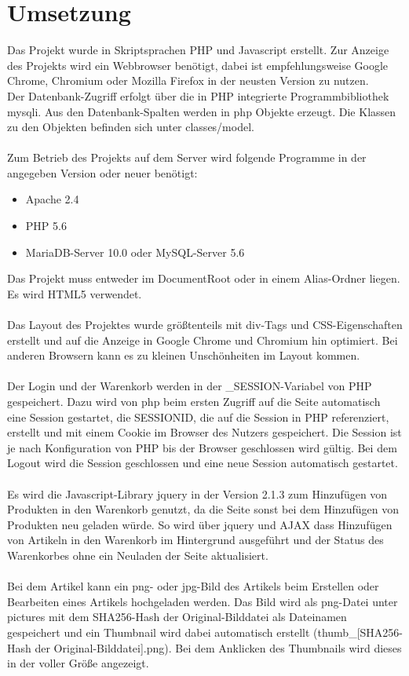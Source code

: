 \documentclass[a4paper,oneside,12pt]{scrartcl}
\begin{document}
\section{Umsetzung}
Das Projekt wurde in Skriptsprachen PHP und Javascript erstellt.
Zur Anzeige des Projekts wird ein Webbrowser benötigt, dabei ist empfehlungsweise
Google Chrome, Chromium oder Mozilla Firefox in der neusten Version zu nutzen.\\
Der Datenbank-Zugriff erfolgt über die in PHP integrierte Programmbibliothek mysqli.
Aus den Datenbank-Spalten werden in php Objekte erzeugt. Die Klassen zu den Objekten befinden sich unter classes/model.\\
\\
Zum Betrieb des Projekts auf dem Server wird folgende Programme in der angegeben Version oder neuer benötigt:
\begin{itemize}
 \item Apache 2.4
 \item PHP 5.6
 \item MariaDB-Server 10.0 oder MySQL-Server 5.6
\end{itemize}
Das Projekt muss entweder im DocumentRoot oder in einem Alias-Ordner liegen. Es wird HTML5 verwendet.\\
\\
Das Layout des Projektes wurde größtenteils mit div-Tags und CSS-Eigenschaften erstellt und auf die Anzeige
in Google Chrome und Chromium hin optimiert. Bei anderen Browsern kann es zu kleinen Unschönheiten im Layout kommen.\\
\\
Der Login und der Warenkorb werden in der \_SESSION-Variabel von PHP gespeichert. Dazu wird von php beim ersten Zugriff auf die Seite automatisch eine
Session gestartet, die SESSIONID, die auf die Session in PHP referenziert, erstellt und mit einem Cookie im Browser des Nutzers gespeichert. 
Die Session ist je nach Konfiguration von PHP bis der Browser geschlossen wird gültig.
Bei dem Logout wird die Session geschlossen und eine neue Session automatisch gestartet.\\
\\
Es wird die Javascript-Library jquery in der Version 2.1.3 zum Hinzufügen von Produkten in den Warenkorb genutzt,
da die Seite sonst bei dem Hinzufügen von Produkten neu geladen würde. So wird über jquery und AJAX dass
Hinzufügen von Artikeln in den Warenkorb im Hintergrund ausgeführt und der Status des Warenkorbes ohne ein 
Neuladen der Seite aktualisiert.\\
\\
Bei dem Artikel kann ein png- oder jpg-Bild des Artikels beim Erstellen oder Bearbeiten eines Artikels hochgeladen werden. 
Das Bild wird als png-Datei unter pictures mit dem SHA256-Hash der Original-Bilddatei als Dateinamen gespeichert 
und ein Thumbnail wird dabei automatisch erstellt (thumb\_[SHA256-Hash der Original-Bilddatei].png).
Bei dem Anklicken des Thumbnails wird dieses in der voller Größe angezeigt.
\end{document}
